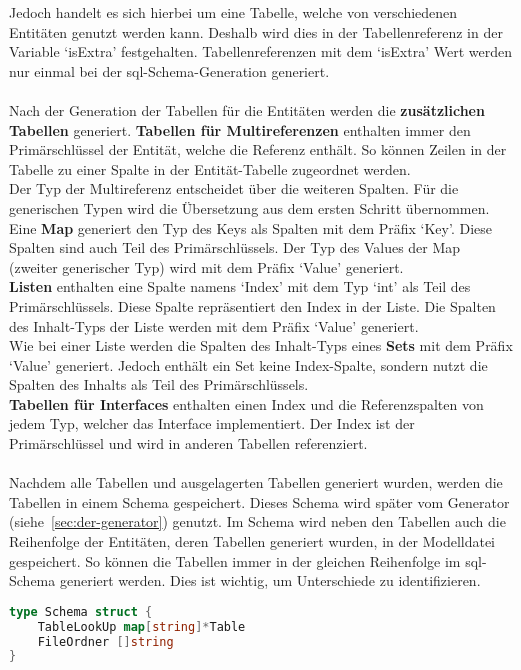 \documentclass[./einleitung.tex]{subfiles}
\begin{document}
    Jedoch handelt es sich hierbei um eine Tabelle, welche von verschiedenen Entitäten genutzt werden kann.
    Deshalb wird dies in der Tabellenreferenz in der Variable `isExtra' festgehalten.
    Tabellenreferenzen mit dem `isExtra' Wert werden nur einmal bei der \acrshort{sql}-Schema-Generation generiert.
    \\\\
    Nach der Generation der Tabellen für die Entitäten werden die \textbf{zusätzlichen Tabellen} generiert.
    \textbf{Tabellen für Multireferenzen} enthalten immer den Primärschlüssel der Entität, welche die Referenz enthält.
    So können Zeilen in der Tabelle zu einer Spalte in der Entität-Tabelle zugeordnet werden.\\
    Der Typ der Multireferenz entscheidet über die weiteren Spalten.
    Für die generischen Typen wird die Übersetzung aus dem ersten Schritt übernommen.\\
    Eine \textbf{Map} generiert den Typ des Keys als Spalten mit dem Präfix `Key'.
    Diese Spalten sind auch Teil des Primärschlüssels.
    Der Typ des Values der Map (zweiter generischer Typ) wird mit dem Präfix `Value' generiert.\\
    \textbf{Listen} enthalten eine Spalte namens `Index' mit dem Typ `int' als Teil des Primärschlüssels.
    Diese Spalte repräsentiert den Index in der Liste.
    Die Spalten des Inhalt-Typs der Liste werden mit dem Präfix `Value' generiert.\\
    Wie bei einer Liste werden die Spalten des Inhalt-Typs eines \textbf{Sets} mit dem Präfix `Value' generiert.
    Jedoch enthält ein Set keine Index-Spalte, sondern nutzt die Spalten des Inhalts als Teil des Primärschlüssels.\\
    \textbf{Tabellen für Interfaces} enthalten einen Index und die Referenzspalten von jedem Typ, welcher das Interface implementiert.
    Der Index ist der Primärschlüssel und wird in anderen Tabellen referenziert.
    \\\\
    Nachdem alle Tabellen und ausgelagerten Tabellen generiert wurden, werden die Tabellen in einem Schema gespeichert.
    Dieses Schema wird später vom Generator (siehe~\ref{sec:der-generator}) genutzt.
    Im Schema wird neben den Tabellen auch die Reihenfolge der Entitäten, deren Tabellen generiert wurden, in der Modelldatei gespeichert.
    So können die Tabellen immer in der gleichen Reihenfolge im \acrshort{sql}-Schema generiert werden.
    Dies ist wichtig, um Unterschiede zu identifizieren.
    \begin{lstlisting}[language=Go, caption=Datenstruktur Schema, label=lst:schema]
type Schema struct {
	TableLookUp map[string]*Table
    FileOrdner []string
}
    \end{lstlisting}
\end{document}
